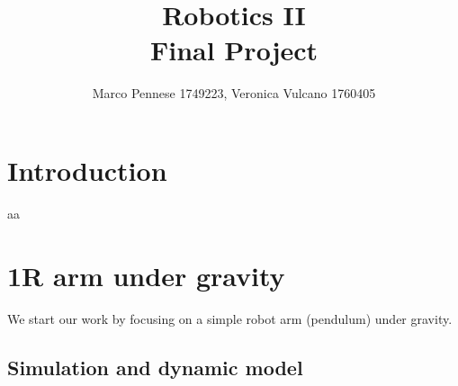 \documentclass{article}
\title{\textbf{Robotics II} \\ \large{\textbf{Final Project}}}
\author{Marco Pennese 1749223, Veronica Vulcano 1760405}
\date{}
\begin{document}
\maketitle
\tableofcontents
\pagebreak

\section{Introduction}
aa
\section{1R arm under gravity}
\paragraph{}We start our work by focusing on a simple robot arm (pendulum) under gravity.
\subsection{Simulation and dynamic model}
\end{document}
